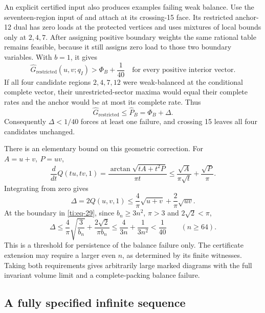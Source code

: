 \documentclass[11pt]{article}
\numberwithin{equation}{section}
\theoremstyle{definition}\newtheorem{definition}[theorem]{Definition}
\theoremstyle{remark}\newtheorem{remark}[theorem]{Remark}
\begin{document}
An explicit certified input also produces examples failing weak balance. Use the seventeen-region input of \cite[Theorem~6.1]{Planar} and attach at its crossing-15 face. Its restricted anchor-12 dual \cite[Equation (6.3)]{Planar} has zero loads at the protected vertices and uses mixtures of local bounds only at \(2,4,7\). After assigning positive boundary weights the same rational table remains feasible, because it still assigns zero load to those two boundary variables. With \(b=1\), it gives
\begin{equation}\label{ti:eq-30}
\widehat G_{\mathrm{restricted}}(u,v;q_I)>
\Phi_B+\frac1{40}
\quad\text{for every positive interior vector}.
\end{equation}
If all four candidate regions \(2,4,7,12\) were weak-balanced at the conditional complete vector, their unrestricted-sector maxima would equal their complete rates and the anchor would be at most its complete rate. Thus
\begin{equation}\label{ti:eq-31}
\widehat G_{\mathrm{restricted}}\le
\widehat P_B=\Phi_B+\Delta.
\end{equation}
Consequently \(\Delta<1/40\) forces at least one failure, and crossing 15 leaves all four candidates unchanged.

There is an elementary bound on this geometric correction. For \(A=u+v,\ P=uv\),
\begin{equation}\label{ti:eq-32}
\frac{d}{dt}Q(tu,tv,1)
=\frac{\arctan\sqrt{tA+t^2P}}{\pi t}
\le\frac{\sqrt A}{\pi\sqrt t}+\frac{\sqrt P}{\pi}.
\end{equation}
Integrating from zero gives
\begin{equation}\label{ti:eq-33}
\Delta=2Q(u,v,1)\le\frac4\pi\sqrt{u+v}+
\frac2\pi\sqrt{uv}.
\end{equation}
At the boundary in \eqref{ti:eq-29}, since \(b_n\ge3n^2\), \(\pi>3\) and \(2\sqrt2<\pi\),
\begin{equation}\label{ti:eq-34}
\Delta\le\frac4\pi\sqrt{\frac3{b_n}}
+\frac{2\sqrt2}{\pi b_n}
\le\frac4{3n}+\frac1{3n^2}<\frac1{40}
\qquad(n\ge64).
\end{equation}
This is a threshold for persistence of the balance failure only. The certificate extension may require a larger even \(n\), as determined by its finite witnesses. Taking both requirements gives arbitrarily large marked diagrams with the full invariant volume limit and a complete-packing balance failure.

\subsection{A fully specified infinite sequence}\label{a-fully-specified-infinite-sequence}
\end{document}

